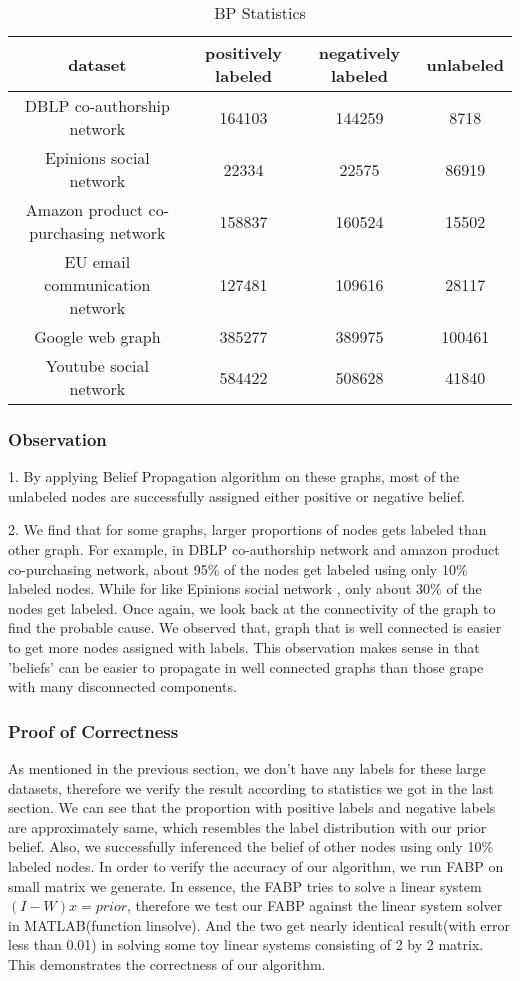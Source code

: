 \begin{table}[!htbf]
\caption{BP Statistics}
\begin{center}
\begin{tabular}{|c|c|c|c|}
\hline \hline
dataset & positively labeled & negatively labeled & unlabeled  \\
\hline
DBLP co-authorship network & 164103  & 144259  & 8718 \\
Epinions social network & 22334  & 22575  & 86919 \\
Amazon product co-purchasing network & 158837 & 160524 & 15502 \\
EU email communication network & 127481 & 109616 & 28117 \\
Google web graph & 385277 & 389975 & 100461 \\
Youtube social network & 584422 & 508628 & 41840 \\
\hline
\end{tabular}
\end{center}
\label{t5:table2}
\end{table}%

 
\subsubsection{Observation}
1. By applying Belief Propagation algorithm on these graphs, most of the unlabeled nodes are successfully assigned either positive or negative belief.

2. We find that for some graphs, larger proportions of nodes gets labeled than other graph. For example, in DBLP co-authorship network and amazon product co-purchasing network,  about 95\%  of the nodes get labeled using only 10\% labeled nodes. While for like Epinions social network , only about 30\% of the nodes get labeled. Once again, we look back at the connectivity of the graph to find the probable cause. We observed that, graph that is well connected is easier to get more nodes assigned with labels. This observation makes sense in that 'beliefs' can be easier to propagate in well connected graphs than those grape with many disconnected components.

\subsubsection{Proof of Correctness}
As mentioned in the previous section, we don't have any labels for these large datasets, therefore we verify the result according to statistics we got in the last section. We can see that the proportion with positive labels and negative labels are approximately same, which resembles the label distribution with our prior belief. Also, we successfully inferenced the belief of other nodes using only 10\% labeled nodes.
In order to verify the accuracy of our algorithm, we run FABP on small matrix we generate. In essence, the FABP tries to solve a linear system $(I - W)x = prior$, therefore we test our FABP against the linear system solver in MATLAB(function linsolve). And the two get nearly identical result(with error less than 0.01) in solving some toy linear systems consisting of 2 by 2 matrix. This demonstrates the correctness  of our algorithm.




